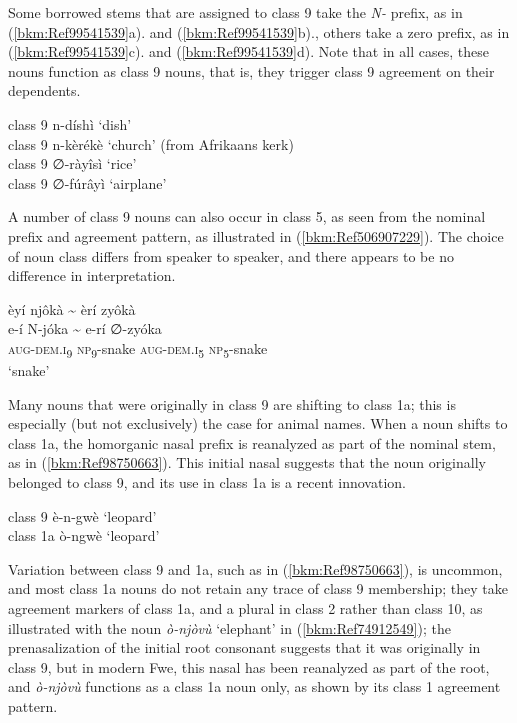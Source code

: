 Some borrowed stems that are assigned to class 9 take the \textit{N-} prefix, as in (\ref{bkm:Ref99541539}a). and (\ref{bkm:Ref99541539}b)., others take a zero prefix, as in (\ref{bkm:Ref99541539}c). and (\ref{bkm:Ref99541539}d). Note that in all cases, these nouns function as class 9 nouns, that is, they trigger class 9 agreement on their dependents.

\ea
\label{bkm:Ref99541539}
\ea class 9    n-díshì    ‘dish’\\
\ex class 9    n-kèrékè    ‘church’ (from Afrikaans kerk)\\
\ex class 9    ∅-ràyîsì    ‘rice’\\
\ex class 9    ∅-fúrâyì    ‘airplane’
\z\z

A number of class 9 nouns can also occur in class 5, as seen from the nominal prefix and agreement pattern, as illustrated in (\ref{bkm:Ref506907229}). The choice of noun class differs from speaker to speaker, and there appears to be no difference in interpretation.

\ea
\label{bkm:Ref506907229}
èyí njôkà {\textasciitilde} èrí zyôkà\\
\gll e-í    N-jóka  {\textasciitilde}   e-rí    ∅-zyóka\\
\textsc{aug}-\textsc{dem}.\textsc{i}\textsubscript{9}  \textsc{np}\textsubscript{9}-snake   {} \textsc{aug}-\textsc{dem}.\textsc{i}\textsubscript{5}  \textsc{np}\textsubscript{5}-snake\\
\glt ‘snake’
\z

Many nouns that were originally in class 9 are shifting to class 1a; this is especially (but not exclusively) the case for animal names. When a noun shifts to class 1a, the homorganic nasal prefix is reanalyzed as part of the nominal stem, as in (\ref{bkm:Ref98750663}). This initial nasal suggests that the noun originally belonged to class 9, and its use in class 1a is a recent innovation.

\ea
\label{bkm:Ref98750663}
\ea class 9    è-n-gwè    ‘leopard’\\
\ex class 1a  ò-ngwè    ‘leopard’
\z\z

Variation between class 9 and 1a, such as in (\ref{bkm:Ref98750663}), is uncommon, and most class 1a nouns do not retain any trace of class 9 membership; they take agreement markers of class 1a, and a plural in class 2 rather than class 10, as illustrated with the noun \textit{ò-njòvù} ‘elephant’ in (\ref{bkm:Ref74912549}); the prenasalization of the initial root consonant suggests that it was originally in class 9, but in modern Fwe, this nasal has been reanalyzed as part of the root, and \textit{ò-njòvù} functions as a class 1a noun only, as shown by its class 1 agreement pattern.

